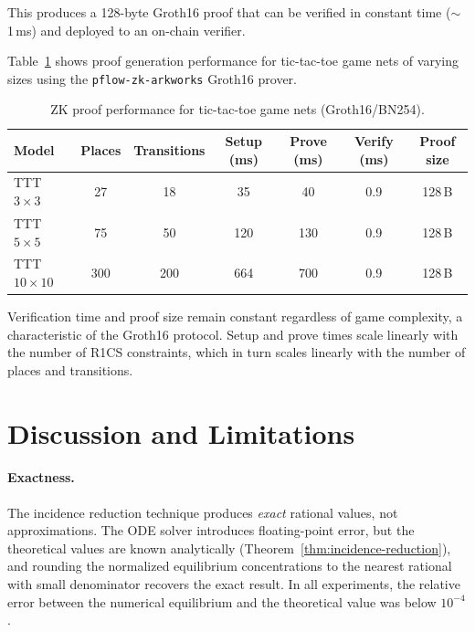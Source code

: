 \documentclass[11pt,a4paper]{article}
\begin{document}
This produces a 128-byte Groth16 proof that can be verified in constant time ($\sim$1\,ms) and deployed to an on-chain verifier.

Table~\ref{tab:zk-perf} shows proof generation performance for tic-tac-toe game nets of varying sizes using the \texttt{pflow-zk-arkworks} Groth16 prover.

\begin{table}[ht]
\centering
\caption{ZK proof performance for tic-tac-toe game nets (Groth16/BN254).}
\label{tab:zk-perf}
\begin{tabular}{@{}lcccccc@{}}
\toprule
Model & Places & Transitions & Setup (ms) & Prove (ms) & Verify (ms) & Proof size \\
\midrule
TTT $3 \times 3$  &  27 &  18 &   35 &   40 & 0.9 & 128\,B \\
TTT $5 \times 5$  &  75 &  50 &  120 &  130 & 0.9 & 128\,B \\
TTT $10 \times 10$ & 300 & 200 &  664 &  700 & 0.9 & 128\,B \\
\bottomrule
\end{tabular}
\end{table}

Verification time and proof size remain constant regardless of game complexity, a characteristic of the Groth16 protocol.
Setup and prove times scale linearly with the number of R1CS constraints, which in turn scales linearly with the number of places and transitions.

\section{Discussion and Limitations}
\label{sec:discussion}

\paragraph{Exactness.}
The incidence reduction technique produces \emph{exact} rational values, not approximations.
The ODE solver introduces floating-point error, but the theoretical values are known analytically (Theorem~\ref{thm:incidence-reduction}), and rounding the normalized equilibrium concentrations to the nearest rational with small denominator recovers the exact result.
In all experiments, the relative error between the numerical equilibrium and the theoretical value was below $10^{-4}$.
\end{document}
